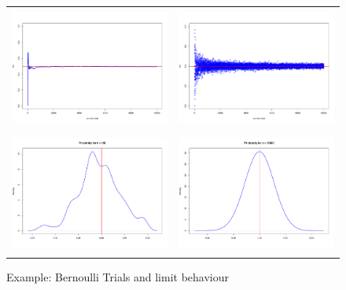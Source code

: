 \documentclass[notes=show,smaller,handout]{beamer}\usepackage[]{graphicx}\usepackage[]{color}
\begin{document}
\begin{frame}{\secname}


  \begin{figure}[ptb]\centering
  \begin{tabular} {cc}
  \includegraphics[height=1.56in, width=2.2in]{img/OneSample_Pn.pdf} &
  \includegraphics[height=1.56in, width=2.2in]{img/ManySamples_Pn.pdf} \\
  \includegraphics[height=1.56in, width=2.2in]{img/NonGauss_Pn.pdf} &
  \includegraphics[height=1.56in, width=2.2in]{img/Gauss_Pn.pdf}
  \end{tabular}
  \caption{Example: Bernoulli Trials and limit behaviour}
  \end{figure}

\end{frame}
\end{document}
